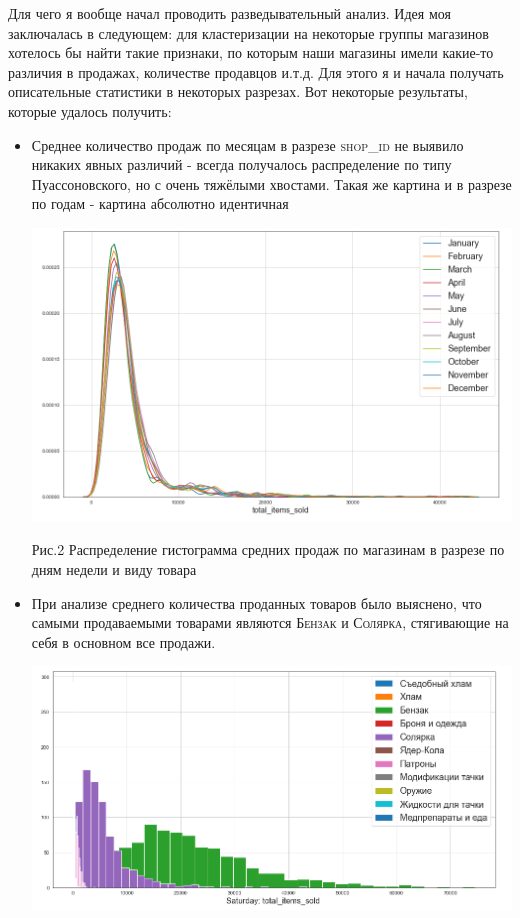\documentclass[%
10pt, %
final, %
oneside, %
onecolumn, %
centertags]{article} %
\theoremstyle{plain}
\theoremstyle{definition}
\theoremstyle{remark}
\begin{document}
Для чего я вообще начал проводить разведывательный анализ. Идея моя заключалась в следующем: для кластеризации на некоторые группы магазинов хотелось бы найти такие признаки, по которым наши магазины имели какие-то различия в продажах, количестве продавцов и.т.д. Для этого я и начала получать описательные статистики в некоторых разрезах. Вот некоторые результаты, которые удалось получить:
\begin{itemize}
	\item Среднее количество продаж по месяцам в разрезе \textsc{shop\_id} не выявило никаких явных различий - всегда получалось распределение по типу Пуассоновского, но с очень тяжёлыми хвостами. Такая же картина и в разрезе по годам - картина абсолютно идентичная
	\begin{center}
	\includegraphics[scale=0.35]{2.png}

 	Рис.2 Распределение гистограмма средних продаж по магазинам в разрезе по дням недели и виду товара
 	\end{center}
 	\item При анализе среднего количества проданных товаров было выяснено, что самыми продаваемыми товарами являются \textsc{Бензак} и \textsc{Солярка}, стягивающие на себя в основном все продажи.
	\begin{center}
	\includegraphics[scale=0.35]{3.png}


\end{center}
\end{itemize}
\end{document}
